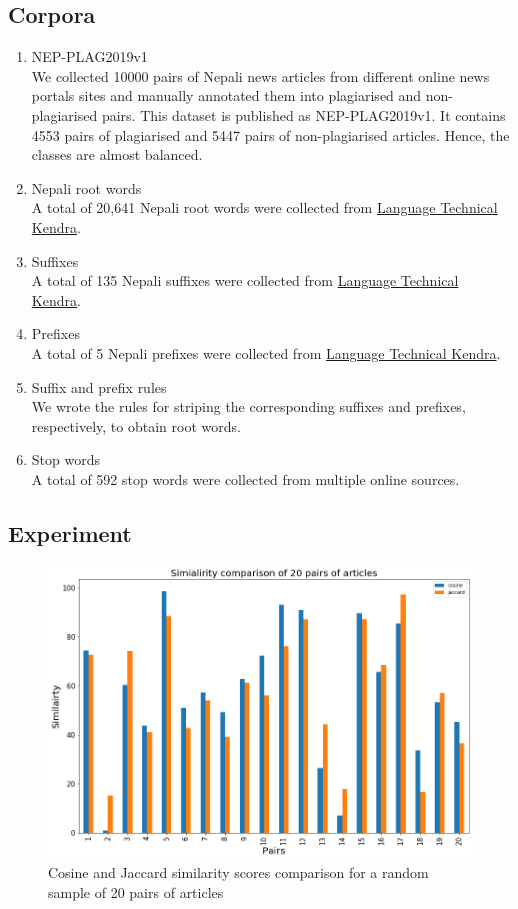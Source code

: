 \documentclass[conference]{IEEEtran}
\begin{document}
\subsection{Corpora}

\begin{enumerate}
\item NEP-PLAG2019v1\\
We collected 10000 pairs of Nepali news articles from different online news
portals sites and manually annotated them into plagiarised and non-plagiarised
pairs. This dataset is published as NEP-PLAG2019v1. It contains 4553 pairs 
of plagiarised and 5447 pairs of non-plagiarised articles. Hence, the classes
are almost balanced.
\medskip

\item Nepali root words\\
A total of 20,641 Nepali root words were collected from \href{http://ltk.org.np}{Language Technical Kendra}.
\medskip

\item Suffixes\\
A total of 135 Nepali suffixes were collected from \href{http://ltk.org.np}{Language Technical Kendra}.
\medskip

\item Prefixes\\
A total of 5 Nepali prefixes were collected from \href{http://ltk.org.np}{Language Technical Kendra}.
\medskip

\item Suffix and prefix rules\\
We wrote the rules for striping the corresponding suffixes and prefixes, respectively, to obtain root words.
\medskip

\item Stop words\\
A total of 592 stop words were collected from multiple online sources.

\end{enumerate}

\subsection{Experiment}

\begin{figure}[h!]
  \centerline{\includegraphics[width=0.4 \textwidth]{figures/similarity.png}}
\caption{Cosine and Jaccard similarity scores comparison for a random sample of 20 pairs of articles}
\label{similarity}
\end{figure}
\end{document}
